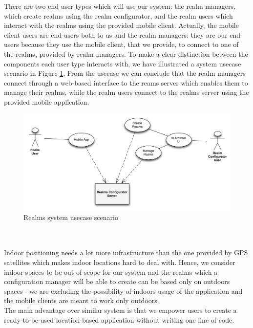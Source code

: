 \noindent There are two end user types which will use our system: the realm managers, which create realms using the realm configurator, and the realm users which interact with the realms using the provided mobile client. Actually, the mobile client users are end-users both to us and the realm managers: they are our end-users because they use the mobile client, that we provide, to connect to one of the realms, provided by realm managers. To make a clear distinction between the components each user type interacts with, we have illustrated a system usecase scenario in Figure \ref{fig.system_usecase}. From the usecase we can conclude that the realm managers connect through a web-based interface to the reams server which enables them to manage their realms, while the realm users connect to the realms server using the provided mobile application.
\begin{figure}
	\centering
	\includegraphics[width=1.0\linewidth]{fig/system_use_usecase}
	\caption{Realms system usecase scenario}
	\label{fig.system_usecase}
\end{figure}
\\

\\
\noindent Indoor positioning needs a lot more infrastructure than the one provided by GPS satellites which makes indoor locations hard to deal with. Hence, we consider indoor spaces to be out of scope for our system and the realms which a configuration manager will be able to create can be based only on outdoors spaces - we are excluding the possibility of indoors usage of the application and the mobile clients are meant to work only outdoors.
\\

\noindent The main advantage over similar system is that we empower users to create a ready-to-be-used location-based application without writing one line of code.
\\

